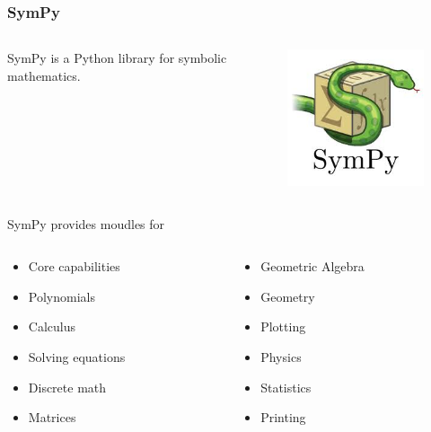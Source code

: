 \documentclass[compress=true]{beamer}
\begin{document}
\begin{frame}
	\frametitle{SymPy}
	\begin{columns}
		\begin{column}{0.5\textwidth}
			\begin{center}
				SymPy is a Python library for symbolic mathematics.
			\end{center}
		\end{column}
		\begin{column}{0.5\textwidth}
			\begin{figure}
				\includegraphics[height=0.3\textheight]{sympy.png}
			\end{figure}
		\end{column}
	\end{columns}
	SymPy provides moudles for 
	\begin{columns}
		\begin{column}{0.5\textwidth}
		\begin{itemize}
			\item Core capabilities
			\item Polynomials
			\item Calculus
			\item Solving equations
			\item Discrete math
			\item Matrices
		\end{itemize}
	\end{column}
	\begin{column}{0.5\textwidth}
		\begin{itemize}
			\item Geometric Algebra
			\item Geometry
			\item Plotting
			\item Physics
			\item Statistics
			\item Printing
		\end{itemize}
	\end{column}
\end{columns}
\end{frame}
\end{document}
